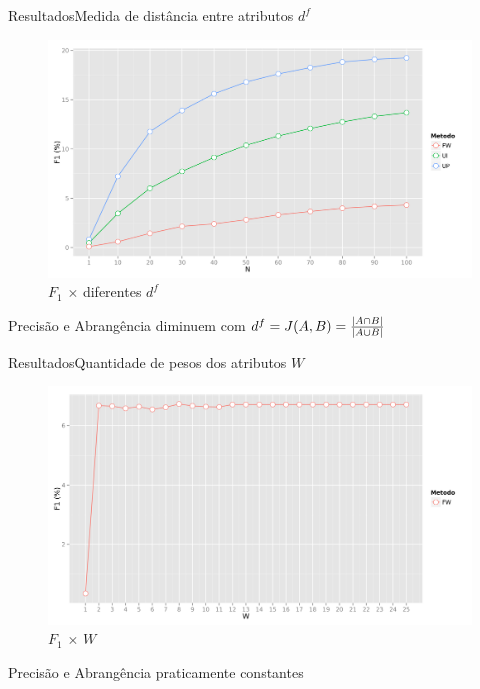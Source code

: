 \begin{frame}{Resultados}{Medida de distância entre atributos $d^f$}
\begin{figure}[ht]
    \begin{center}
    \includegraphics[width=.8\textwidth]{../img/F1_N_d}
    \end{center}
    \caption{$F_1$ $\times$ diferentes $d^f$}
    \label{fig:F1_N_d}
\end{figure}
\begin{center}
    Precisão e Abrangência diminuem com $d^f=J(A,B) ={{|A \cap B|}\over{|A \cup B|}}$
\end{center}
\end{frame}

\begin{frame}{Resultados}{Quantidade de pesos dos atributos $W$}
\begin{figure}[ht]
    \begin{center}
    \includegraphics[width=.8\textwidth]{../img/F1_W}
    \end{center}
    \caption{$F_1$ $\times$ $W$}
    \label{fig:F1_W}
\end{figure}
\begin{center}
    Precisão e Abrangência praticamente constantes
\end{center}
\end{frame}